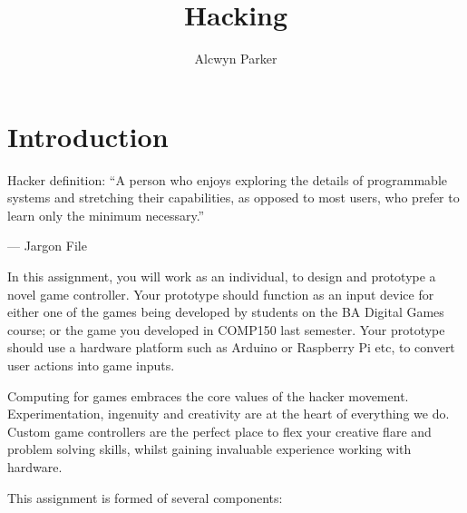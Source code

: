 \documentclass{../fal_assignment}
\title{Hacking }
\author{Alcwyn Parker}
\begin{document}
\maketitle

\section*{Introduction}

\begin{marginquote}
Hacker definition: ``A person who enjoys exploring the details of programmable systems and stretching their capabilities, as opposed to most users, who prefer to learn only the minimum necessary.''

--- Jargon File

\end{marginquote}
In this assignment, you will work as an individual, to design and prototype a novel game controller. Your prototype should function as an input device for either one of the games being developed by students on the BA Digital Games course; or the game you developed in COMP150 last semester. Your prototype should use a hardware platform such as Arduino or Raspberry Pi etc, to convert user actions into game inputs. 

Computing for games embraces the core values of the hacker movement.  Experimentation, ingenuity and creativity are at the heart of everything we do. Custom game controllers are the perfect place to flex your creative flare and problem solving skills, whilst gaining invaluable experience working with hardware. 

This assignment is formed of several components:
\end{document}
